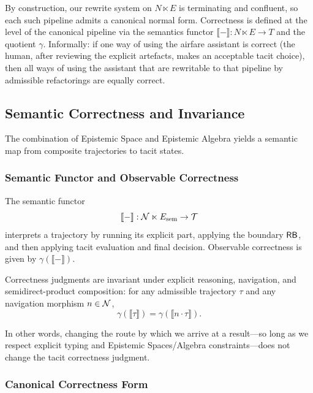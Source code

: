 By construction, our rewrite system on \(N \ltimes E\) is terminating and confluent, so each such pipeline admits a canonical normal form. Correctness is defined at the level of the canonical pipeline via the semantics functor \(\llbracket - \rrbracket : N \ltimes E \to T\) and the quotient \(\gamma\). Informally: if one way of using the airfare assistant is correct (the human, after reviewing the explicit artefacts, makes an acceptable tacit choice), then all ways of using the assistant that are rewritable to that pipeline by admissible refactorings are equally correct.


\subsection{Semantic Correctness and Invariance}
\label{sec:semantics}

The combination of Epistemic Space and Epistemic Algebra yields a semantic map from composite
trajectories to tacit states.

\subsubsection{Semantic Functor and Observable Correctness}

The semantic functor
\[
\llbracket - \rrbracket: \mathcal{N} \ltimes E_{\mathrm{sem}}\to\mathcal{T}
\]
interprets a trajectory by running its explicit part, applying the
boundary \(\mathsf{RB}\), and then applying tacit evaluation and final decision.
Observable correctness is given by \(\gamma(\llbracket - \rrbracket)\).

\begin{theorem}
Correctness judgments are invariant under explicit reasoning,
navigation, and semidirect-product composition: for any admissible
trajectory \(\tau\) and any navigation morphism \(n\in\mathcal{N}\),
\[
\gamma(\llbracket \tau \rrbracket)
 =
\gamma(\llbracket n\cdot \tau \rrbracket).
\]
\end{theorem}

In other words, changing the route by which we arrive at a result---so
long as we respect explicit typing and Epistemic Spaces/Algebra constraints---does not
change the tacit correctness judgment.

\subsubsection{Canonical Correctness Form}

